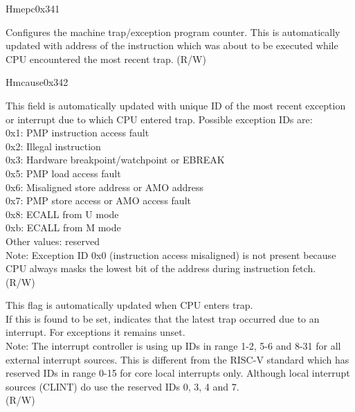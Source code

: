\begin{register}{H}{mepc}{0x341}\label{regdesc:MEPC}
%
\regnewline%
\begin{regdesc}\begin{reglist}
\label{fielddesc:MEPC}\item [MEPC] Configures the machine trap/exception program counter. This is automatically updated with address of the instruction which was about to be executed while CPU encountered the most recent trap. (R/W)
\end{reglist}\end{regdesc}
\end{register}

\begin{register}{H}{mcause}{0x342}\label{regdesc:MCAUSE}
%
%
%
\regnewline%
\begin{regdesc}\begin{reglist}
\label{fielddesc:MCAUSECODE}\item [Exception Code] This field is automatically updated with unique ID of the most recent exception or interrupt due to which CPU entered trap. Possible exception IDs are:\\
0x1: PMP instruction access fault\\
0x2: Illegal instruction\\
0x3: Hardware breakpoint/watchpoint or EBREAK\\
0x5: PMP load access fault\\
0x6: Misaligned store address or AMO address\\
0x7: PMP store access or AMO access fault\\
0x8: ECALL from U mode\\
0xb: ECALL from M mode\\
Other values: reserved\\
Note: Exception ID 0x0 (instruction access misaligned) is not present because CPU always masks the lowest bit of the address during instruction fetch.\\
(R/W)
\label{fielddesc:MCAUSEINT}\item [Interrupt Flag] This flag is automatically updated when CPU enters trap.\\
If this is found to be set, indicates that the latest trap occurred due to an interrupt. For exceptions it remains unset. \\
Note: The interrupt controller is using up IDs in range 1-2, 5-6 and 8-31 for all external interrupt sources. This is different from the RISC-V standard which has reserved IDs in range 0-15 for core local interrupts only. Although local interrupt sources (CLINT) do use the reserved IDs 0, 3, 4 and 7.\\
(R/W) 
\end{reglist}\end{regdesc}
\end{register}

